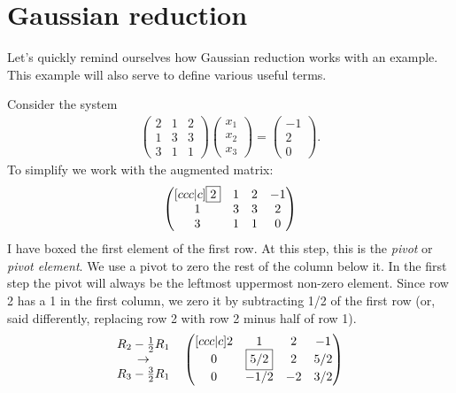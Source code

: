 \section{Gaussian reduction}
Let's quickly remind ourselves how Gaussian reduction works with an example. This example will also serve to define various useful terms.

\exemple{\upline}
{
	Consider the system
	\begin{align*}
	\begin{pmatrix}
	2 & 1 & 2 \\
	1 & 3 & 3 \\
	3 & 1 & 1
	\end{pmatrix}
	\begin{pmatrix}
	x_1 \\
	x_2 \\
	x_3
	\end{pmatrix}
	=
	\begin{pmatrix}
	-1 \\
	2 \\
	0
	\end{pmatrix}.
	\end{align*}
	To simplify we work with the augmented matrix:
	\begin{align*}
	\begin{pmatrix}[ccc|c]
	\fbox{2} & 1 & 2 & -1 \\
	1 & 3 & 3 & 2 \\
	3 & 1 & 1 & 0
	\end{pmatrix}
    \end{align*}
    I have boxed the first element of the first row. At this step, this is the \textit{pivot} or \textit{pivot element}. We use a pivot to zero the rest of the column below it. In the first step the pivot will always be the leftmost uppermost non-zero element. Since row 2 has a 1 in the first column, we zero it by subtracting 1/2 of the first row (or, said differently, replacing row 2 with row 2 minus half of row 1).
	\begin{align*}
	\begin{matrix}
	R_2 - \frac{1}{2}R_1 \\
	\to \\
    R_3 - \frac{3}{2}R_1
    \end{matrix}
    \quad
    \begin{pmatrix}[ccc|c]
    2 &    1 &  2 &  -1 \\
    0 &  \fbox{5/2} &  2 & 5/2 \\
    0 & -1/2 & -2 & 3/2
    \end{pmatrix}

\end{align*}}
